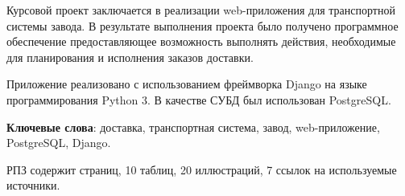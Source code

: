 Курсовой проект заключается в реализации web-приложения для транспортной системы завода. В результате выполнения проекта было получено программное обеспечение предоставляющее возможность выполнять действия, необходимые для планирования и исполнения заказов доставки.

Приложение реализовано с использованием фреймворка Django на языке программирования Python 3. В качестве СУБД был использован PostgreSQL.

\textbf{Ключевые слова}: доставка, транспортная система, завод, web-приложение, PostgreSQL, Django.

РПЗ содержит \pageref{lastpage} страниц, 
10 таблиц,
20 иллюстраций,
7 ссылок на используемые источники.
